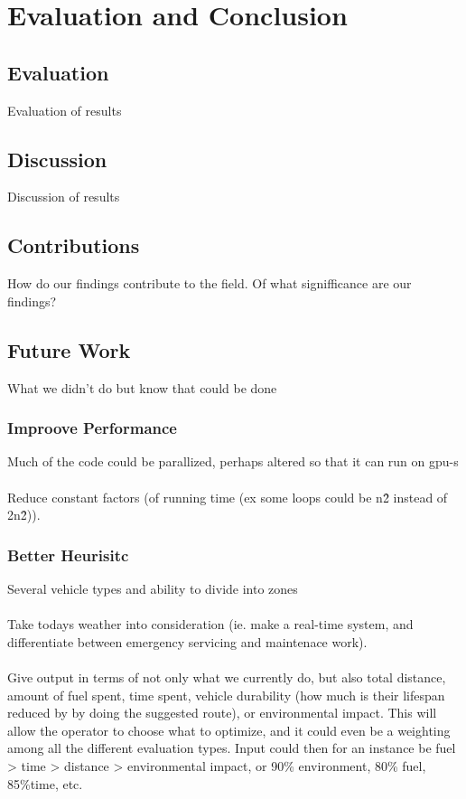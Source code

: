 \chapter{Evaluation and Conclusion}

\section{Evaluation}
Evaluation of results

\section{Discussion}
Discussion of results

\section{Contributions}
How do our findings contribute to the field. Of what signifficance are our findings?

\section{Future Work}
What we didn't do but know that could be done

\subsection{Improove Performance}
Much of the code could be parallized, perhaps altered so that it can run on gpu-s
\\\\
Reduce constant factors (of running time (ex some loops could be n\^2 instead of 2\*n\^2)).

\subsection{Better Heurisitc}
Several vehicle types and ability to divide into zones
\\\\
Take todays weather into consideration (ie. make a real-time system, and differentiate between emergency servicing and maintenace work).
\\\\
Give output in terms of not only what we currently do, but also total distance, amount of fuel spent, time spent, vehicle durability (how much is their lifespan reduced by by doing the suggested route), or environmental impact. This will allow the operator to choose what to optimize, and it could even be a weighting among all the different evaluation types. Input could then for an instance be fuel > time > distance > environmental impact, or 90\% environment, 80\% fuel, 85\%time, etc.

\cleardoublepage